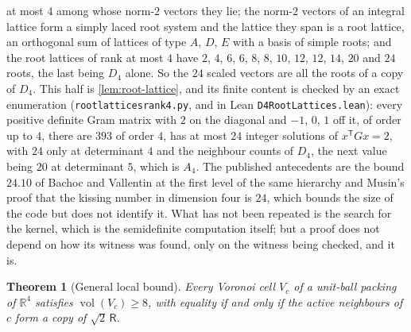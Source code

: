 \documentclass[11pt,reqno]{amsart}
\renewcommand{\_}{\origunderscore\allowbreak}
\numberwithin{equation}{section}
\theoremstyle{plain}
\newtheorem{thm}{Theorem}[section]
\theoremstyle{definition}
\theoremstyle{remark}
\newcommand{\Rt}{\mathsf{R}}                 %
\DeclareMathOperator{\vol}{vol}
\begin{document}
{  at most $4$ among whose norm-$2$ vectors they lie; the norm-$2$
  vectors of an integral lattice form a simply laced root system and
  the lattice they span is a root lattice, an orthogonal sum of
  lattices of type $A$, $D$, $E$ with a basis of simple roots; and the
  root lattices of rank at most $4$ have $2$, $4$, $6$, $6$, $8$, $8$,
  $10$, $12$, $12$, $14$, $20$ and $24$ roots, the last being $D_4$
  alone. So the $24$ scaled vectors are all the roots of a copy of
  $D_4$. This half is \cref{lem:root-lattice}, and its finite content
  is checked by an exact enumeration
  (\texttt{root\_lattices\_rank4.py}, and in Lean
  \texttt{D4RootLattices.lean}): every positive definite Gram
  matrix with $2$ on the diagonal and $-1$, $0$, $1$ off it, of order up
  to $4$, there are $393$ of order $4$, has at most $24$ integer
  solutions of $x^{\mathsf T}Gx=2$, with $24$ only at determinant $4$
  and the neighbour counts of $D_4$, the next value being $20$ at
  determinant $5$, which is $A_4$. The published antecedents are the
  bound $24.10$ of Bachoc and Vallentin \cite{BV08} at the first level
  of the same hierarchy and Musin's proof \cite{Mus08} that the kissing
  number in dimension four is $24$, which bounds the size of the code
  but does not identify it. What has not been repeated is the search
  for the kernel, which is the semidefinite computation itself; but a
  proof does not depend on how its witness was found, only on the
  witness being checked, and it is.}

\begin{thm}[General local bound]\label{thm:local-general}
Every Voronoi cell $V_c$ of a unit-ball packing of $\mathbb{R}^4$
satisfies $\vol(V_c)\ge8$, with equality if and only if the active
neighbours of $c$ form a copy of $\sqrt2\,\Rt$.
\end{thm}
\end{document}
